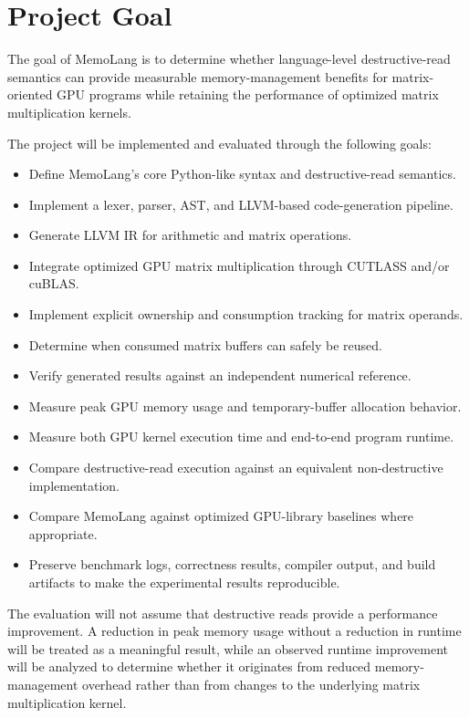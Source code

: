 \documentclass[a4paper]{article}
\begin{document}
	\section{Project Goal}
	
	The goal of MemoLang is to determine whether language-level destructive-read semantics can provide measurable memory-management benefits for matrix-oriented GPU programs while retaining the performance of optimized matrix multiplication kernels.
	
	The project will be implemented and evaluated through the following goals:
	
	\begin{itemize}
		\item Define MemoLang's core Python-like syntax and destructive-read semantics.
		\item Implement a lexer, parser, AST, and LLVM-based code-generation pipeline.
		\item Generate LLVM IR for arithmetic and matrix operations.
		\item Integrate optimized GPU matrix multiplication through CUTLASS and/or cuBLAS.
		\item Implement explicit ownership and consumption tracking for matrix operands.
		\item Determine when consumed matrix buffers can safely be reused.
		\item Verify generated results against an independent numerical reference.
		\item Measure peak GPU memory usage and temporary-buffer allocation behavior.
		\item Measure both GPU kernel execution time and end-to-end program runtime.
		\item Compare destructive-read execution against an equivalent non-destructive implementation.
		\item Compare MemoLang against optimized GPU-library baselines where appropriate.
		\item Preserve benchmark logs, correctness results, compiler output, and build artifacts to make the experimental results reproducible.
	\end{itemize}
	
	The evaluation will not assume that destructive reads provide a performance improvement. A reduction in peak memory usage without a reduction in runtime will be treated as a meaningful result, while an observed runtime improvement will be analyzed to determine whether it originates from reduced memory-management overhead rather than from changes to the underlying matrix multiplication kernel.
	
\end{document}
